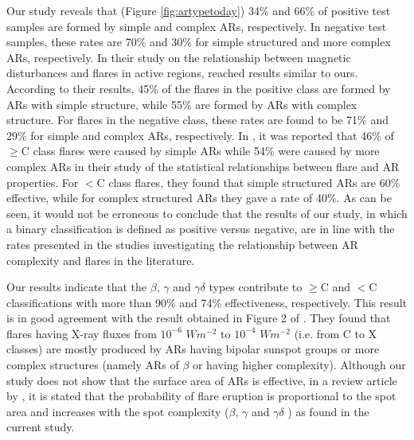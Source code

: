 \documentclass[draft]{agujournal2019}
\begin{document}
Our study reveals that (Figure \ref{fig:artypetoday}) 34\% and 66\%  of positive test samples are formed by simple and complex ARs, respectively. In negative test samples, these rates are 70\% and 30\% for simple structured and more complex ARs, respectively. In their study on the relationship between magnetic disturbances and flares in active regions, \citet{OLOKETUYI2023101972} reached results similar to ours. According to their results, 45\% of the flares in the positive class are formed by ARs with simple structure, while 55\% are formed by ARs with complex structure. For flares in the negative class, these rates are found to be 71\% and 29\% for simple and complex ARs, respectively. In \citet{Yang_2017}, it was reported that 46\% of $\geq$C class flares were caused by simple ARs while 54\% were caused by more complex ARs in their study of the statistical relationships between flare and AR properties. For $<$C class flares, they found that simple structured ARs are 60\% effective, while for complex structured ARs they gave a rate of 40\%. As can be seen, it would not be erroneous to conclude that the results of our study, in which a binary classification is defined as positive versus negative, are in line with the rates presented in the studies investigating the relationship between AR complexity and flares in the literature. 

Our results indicate that the $\beta$, $\gamma$ and $\gamma$$\delta$ types contribute to $\geq$C and $<$C classifications with more than 90\% and 74\% effectiveness, respectively. This result is in good agreement with the result obtained in Figure 2 of \citet{Sammis_2000}. They found that flares having X-ray fluxes from $10^{-6}$ $Wm^{-2}$ to $10^{-4}$  $Wm^{-2}$ (i.e. from C to X classes) are mostly produced by ARs having bipolar sunspot groups or more complex structures (namely ARs of $\beta$ or having higher complexity).  Although our study does not show that the surface area of ARs is effective, in a review article by \citet{2019LRSP...16....3T}, it is stated that the probability of flare eruption is proportional to the spot area and increases with the spot complexity ($\beta$, $\gamma$ and $\gamma$$\delta$ ) as found in the current study.
\end{document}
